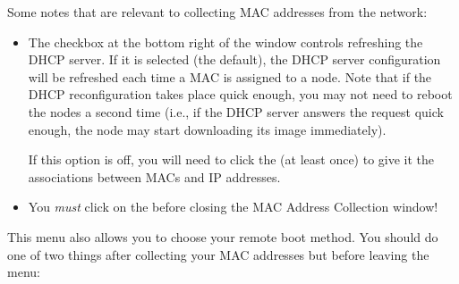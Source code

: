 \noindent Some notes that are relevant to collecting MAC addresses from the
network:

\begin{itemize}
\item The  checkbox at the bottom right of
  the window controls refreshing the DHCP server.  If it is selected
  (the default), the DHCP server configuration will be refreshed each
  time a MAC is assigned to a node.  Note that if the DHCP
  reconfiguration takes place quick enough, you may not need to reboot
  the nodes a second time (i.e., if the DHCP server answers the
  request quick enough, the node may start downloading its image
  immediately).

  If this option is off, you will need to click the  (at least once) to give it the associations between
  MACs and IP addresses.


\item You {\em must} click on the  before
  closing the MAC Address Collection window!
\end{itemize}

This menu also allows you to choose your remote boot method.  You
should do one of two things after collecting your MAC addresses but
before leaving the menu:

